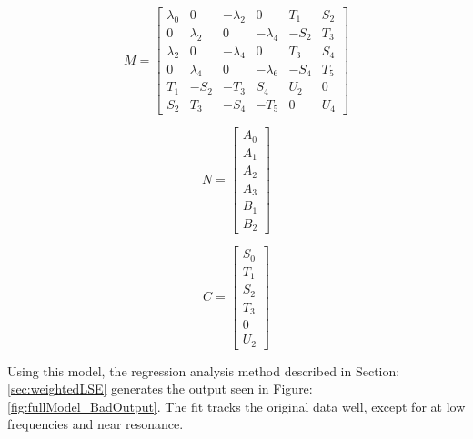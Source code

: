 \begin{equation}
    \label{equ:fullModel_M}
    M = 
    \begin{bmatrix}
        \lambda _0 & 0          & -\lambda _2 & 0           &  T_1    & S_2 \\
        0          & \lambda _2 & 0           & -\lambda _4 & -S_2    & T_3 \\
        \lambda _2 & 0          & -\lambda _4 & 0           &  T_3    & S_4 \\
        0          & \lambda _4 & 0           & -\lambda _6 & -S_4    & T_5 \\
        T_1        & -S_2       & -T_3        &  S_4        &  U_2    & 0   \\
        S_2        &  T_3       & -S_4        & -T_5        &  0      & U_4
    \end{bmatrix}
\end{equation}

\begin{multicols}{2}
    \begin{equation}
        \label{equ:fullModel_N}
        N = 
        \begin{bmatrix}
            A_0 \\
            A_1 \\
            A_2 \\
            A_3 \\
            B_1 \\
            B_2
        \end{bmatrix}
    \end{equation}

    \begin{equation}
        \label{equ:fullModel_C}
        C = 
        \begin{bmatrix}
            S_0 \\
            T_1 \\
            S_2 \\
            T_3 \\
            0   \\
            U_2
        \end{bmatrix}
    \end{equation}
\end{multicols}

Using this model, the regression analysis method described in Section: \ref{sec:weightedLSE} generates the output seen in Figure: \ref{fig:fullModel_BadOutput}. The fit tracks the original data well, except for at low frequencies and near resonance.

